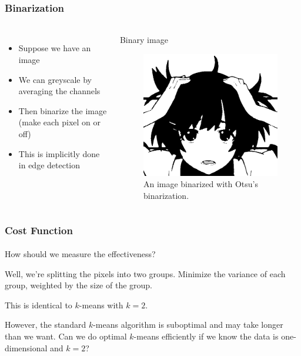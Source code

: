 \documentclass{beamer}                             %
\begin{document}
\begin{frame}
\frametitle{Binarization}
\framesubtitle{}
\begin{columns}
  \begin{itemize}
    \item Suppose we have an image  
    \item We can greyscale by averaging the channels
    \item Then \alert{binarize} the image (make each pixel on or off)
    \item This is implicitly done in edge detection
  \end{itemize}
  \begin{exampleblock}{Binary image} 
    \begin{figure}[h!]
      \centering
      \includegraphics[scale=0.25]{hanekawa_binary}
      \caption{An image binarized with Otsu's binarization.}
    \end{figure}
  \end{exampleblock}
\end{columns}
\end{frame}

\begin{frame}
\frametitle{Cost Function}
\framesubtitle{}
  How should we measure the effectiveness? \pause
  
  Well, we're splitting the pixels into two groups. Minimize the
  variance of each group, weighted by the size of the group. \pause

  This is identical to \( k \)-means with \( k = 2 \). \pause

  However, the standard \( k \)-means algorithm is suboptimal and
  may take longer than we want. Can we do optimal \( k \)-means
  efficiently if we know the data is one-dimensional and \( k = 2 \)?
\end{frame}
\end{document}
